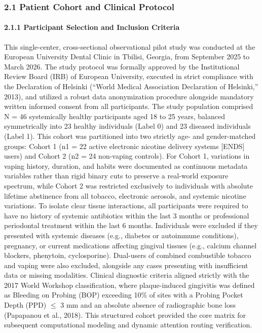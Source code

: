 \documentclass[
]{article}
\begin{document}
\subsubsection{\texorpdfstring{\textbf{2.1 Patient Cohort and Clinical
Protocol}}{2.1 Patient Cohort and Clinical Protocol}}\label{patient-cohort-and-clinical-protocol}

\paragraph{\texorpdfstring{\textbf{2.1.1 Participant Selection and
Inclusion
Criteria}}{2.1.1 Participant Selection and Inclusion Criteria}}\label{participant-selection-and-inclusion-criteria}

This single-center, cross-sectional observational pilot study was
conducted at the European University Dental Clinic in Tbilisi, Georgia,
from September 2025 to March 2026. The study protocol was formally
approved by the Institutional Review Board (IRB) of European University,
executed in strict compliance with the Declaration of Helsinki (``World
Medical Association Declaration of Helsinki,'' 2013), and utilized a
robust data anonymization procedure alongside mandatory written informed
consent from all participants. The study population comprised N = 46
systemically healthy participants aged 18 to 25 years, balanced
symmetrically into 23 healthy individuals (Label 0) and 23 diseased
individuals (Label 1). This cohort was partitioned into two strictly
age- and gender-matched groups: Cohort 1 (n1 = 22 active electronic
nicotine delivery systems {[}ENDS{]} users) and Cohort 2 (n2 = 24
non-vaping controls). For Cohort 1, variations in vaping history,
duration, and habits were documented as continuous metadata variables
rather than rigid binary cuts to preserve a real-world exposure
spectrum, while Cohort 2 was restricted exclusively to individuals with
absolute lifetime abstinence from all tobacco, electronic aerosols, and
systemic nicotine variations. To isolate clear tissue interactions, all
participants were required to have no history of systemic antibiotics
within the last 3 months or professional periodontal treatment within
the last 6 months. Individuals were excluded if they presented with
systemic diseases (e.g., diabetes or autoimmune conditions), pregnancy,
or current medications affecting gingival tissues (e.g., calcium channel
blockers, phenytoin, cyclosporine). Dual-users of combined combustible
tobacco and vaping were also excluded, alongside any cases presenting
with insufficient data or missing modalities. Clinical diagnostic
criteria aligned strictly with the 2017 World Workshop classification,
where plaque-induced gingivitis was defined as Bleeding on Probing (BOP)
exceeding 10\% of sites with a Probing Pocket Depth (PPD) \(\le\) 3 mm
and an absolute absence of radiographic bone loss (Papapanou et al.,
2018). This structured cohort provided the core matrix for subsequent
computational modeling and dynamic attention routing verification.
\end{document}

